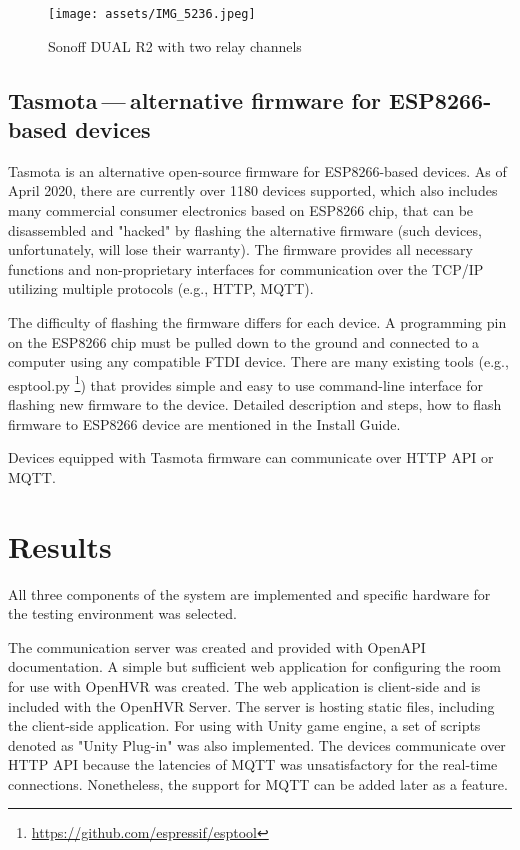 \begin{figure}[h]{}
\centering\texttt{[image: assets/IMG\_5236.jpeg]}
\caption{Sonoff DUAL R2 with two relay channels}

\end{figure}

\hypertarget{x-tasmota — alternative-firmware-for-esp8266-based-devices}{\subsection{Tasmota — alternative firmware for ESP8266-based devices}}
Tasmota is an alternative open-source firmware for ESP8266-based devices.
As of April 2020, there are currently over 1180 devices supported\cite{tasdirec},
which also includes many commercial consumer electronics based on ESP8266 chip,
that can be disassembled and "hacked" by flashing the alternative firmware
(such devices, unfortunately, will lose their warranty).
The firmware provides all necessary functions and non-proprietary
interfaces for communication over the TCP/IP utilizing multiple protocols
(e.g., HTTP, MQTT).


The difficulty of flashing the firmware differs for each device. A programming pin
on the ESP8266 chip must be pulled down to the ground and connected to a computer using
any compatible FTDI device. There are many existing tools (e.g., esptool.py
\footnote{\href{https://github.com/espressif/esptool}{https://github.com/espressif/esptool}})
that provides simple and easy to use command-line
interface for flashing new firmware to the device. Detailed description and
steps, how to flash firmware to ESP8266 device are mentioned in the
Install Guide.

Devices equipped with Tasmota firmware can communicate over HTTP API or MQTT.

\hypertarget{x-results}{\section{Results}}
All three components of the system are implemented and specific hardware
for the testing environment was selected.


The communication server was created and provided with OpenAPI documentation.
A simple but sufficient web application for configuring the room for use with
OpenHVR was created. The web application is client-side and is included with
the OpenHVR Server. The server is hosting static files,
including the client-side application.
For using with Unity game engine, a set of scripts denoted as "Unity Plug-in"
was also implemented. The devices communicate over HTTP API because the
latencies of MQTT was unsatisfactory for the real-time connections. 
Nonetheless, the support for MQTT can be added later as a feature.

